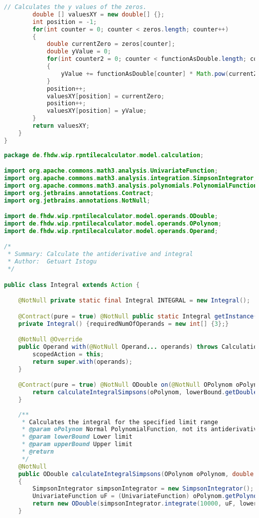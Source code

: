 \begin{lstlisting}[caption=HighAndLowPoints (Keienburg),label=list:HighAndLowPoints,language=Java]
        // Calculates the y values of the zeros.
        double [] valuesXY = new double[] {};
        int position = -1;
        for(int counter = 0; counter < zeros.length; counter++)
        {
            double currentZero = zeros[counter];
            double yValue = 0;
            for(int counter2 = 0; counter < functionAsDouble.length; counter2++)
            {
                yValue += functionAsDouble[counter] * Math.pow(currentZero,(functionAsDouble.length - counter2 - 1));
            }
            position++;
            valuesXY[position] = currentZero;
            position++;
            valuesXY[position] = yValue;
        }
        return valuesXY;
    }
}
\end{lstlisting}    

\begin{lstlisting}[caption=Integral (Istogu),label=list:Integral,language=Java]
package de.fhdw.wip.rpntilecalculator.model.calculation;

import org.apache.commons.math3.analysis.UnivariateFunction;
import org.apache.commons.math3.analysis.integration.SimpsonIntegrator;
import org.apache.commons.math3.analysis.polynomials.PolynomialFunction;
import org.jetbrains.annotations.Contract;
import org.jetbrains.annotations.NotNull;

import de.fhdw.wip.rpntilecalculator.model.operands.ODouble;
import de.fhdw.wip.rpntilecalculator.model.operands.OPolynom;
import de.fhdw.wip.rpntilecalculator.model.operands.Operand;

/*
 * Summary: Calculate the antiderivative and integral
 * Author:  Getuart Istogu
 */

public class Integral extends Action {

    @NotNull private static final Integral INTEGRAL = new Integral();

    @Contract(pure = true) @NotNull public static Integral getInstance() { return INTEGRAL; }
    private Integral() {requiredNumOfOperands = new int[] {3};}

    @NotNull @Override
    public Operand with(@NotNull Operand... operands) throws CalculationException {
        scopedAction = this;
        return super.with(operands);
    }

    @Contract(pure = true) @NotNull ODouble on(@NotNull OPolynom oPolynom, @NotNull ODouble lowerBound, @NotNull ODouble upperBound) {
        return calculateIntegralSimpsons(oPolynom, lowerBound.getDouble(), upperBound.getDouble());
    }
    
    /**
     * Calculates the integral for the specified limit range
     * @param oPolynom Normal PolynomialFunction, not its antiderivative
     * @param lowerBound Lower limit
     * @param upperBound Upper limit
     * @return
     */
    @NotNull
    public ODouble calculateIntegralSimpsons(OPolynom oPolynom, double lowerBound, double upperBound)
    {
        SimpsonIntegrator simpsonIntegrator = new SimpsonIntegrator();
        UnivariateFunction uF = (UnivariateFunction) oPolynom.getPolynom();
        return new ODouble(simpsonIntegrator.integrate(10000, uF, lowerBound, upperBound));
    }


\end{lstlisting}

